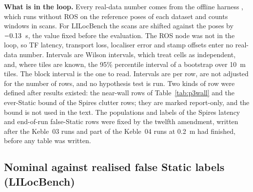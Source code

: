 \noindent\textbf{What is in the loop.} Every real-data number comes from the offline harness , which runs  without ROS on the reference poses of each dataset and counts windows in scans. For LILocBench the scans are shifted against the poses by $-0.13$~s, the value fixed before the evaluation. The ROS node was not in the loop, so TF latency, transport loss, localiser error and stamp offsets enter no real-data number. Intervals are Wilson intervals, which treat cells as independent, and, where tiles are known, the 95\% percentile interval of a bootstrap over 10~m tiles. The block interval is the one to read. Intervals are per row, are not adjusted for the number of rows, and no hypothesis test is run. Two kinds of row were defined after results existed: the near-wall rows of Table~\ref{tab:p3wall} and the ever-Static bound of the Spires clutter rows; they are marked report-only, and the bound is not used in the text. The populations and labels of the Spires latency and end-of-run false-Static rows were fixed by the twelfth amendment, written after the Keble~03 runs and part of the Keble~04 runs at 0.2~m had finished, before any table was written.

\subsection{Nominal against realised false Static labels (LILocBench)}\label{subsec:p3lil}



